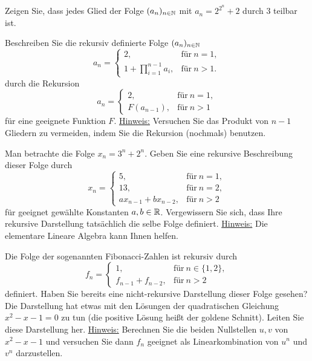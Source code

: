 \begin{aufg}
	Zeigen Sie, dass jedes Glied der Folge $(a_n)_{n \in \mathbb{N}}$ mit $a_n = 2^{2^n} + 2$ durch $3$ teilbar ist. 
\end{aufg} 

\begin{aufg}
	Beschreiben Sie die rekursiv definierte Folge $(a_n)_{n \in \mathbb{N}}$ 
	\[
		a_n = \begin{cases} 
		2, & \text{für} \ n = 1, 
		\\ 1 + \prod_{i=1}^{n-1} a_i, & \text{für} \ n >1. 
		\end{cases}
	\]
	durch die Rekursion 
	\[
		a_n = \begin{cases}
			2, & \text{für} \ n =1,
			\\ F(a_{n-1}), & \text{für} \ n >1
		\end{cases} 
	\]
	für eine geeignete Funktion $F$. \underline{Hinweis:} Versuchen Sie das Produkt von $n-1$ Gliedern zu vermeiden, indem Sie die Rekursion (nochmals) benutzen. 
\end{aufg} 

\begin{aufg}
	Man betrachte die Folge $x_n = 3^n + 2^n$. Geben Sie eine rekursive Beschreibung dieser Folge durch 
	\[
		x_n = \begin{cases} 5, & \text{für} \ n=1,
			\\ 13, & \text{für} \ n=2, 
			\\ a x_{n-1} + b x_{n-2}, & \text{für} \ n > 2 
		\end{cases} 
	\]
	 für geeignet gewählte Konstanten $a, b \in \mathbb{R}$. Vergewissern Sie sich, dass Ihre rekursive Darstellung tatsächlich die selbe Folge definiert. \underline{Hinweis:} Die elementare Lineare Algebra kann Ihnen helfen. 
\end{aufg} 

\begin{aufg} 
	Die Folge der sogenannten Fibonacci-Zahlen ist rekursiv durch 
	\[
		f_n = \begin{cases} 
			1, & \text{für} \ n  \in \{1,2\}, 
			\\ f_{n-1} + f_{n-2}, & \text{für} \ n>2
		\end{cases} 
	\]
	definiert. 
	Haben Sie bereits eine nicht-rekursive Darstellung dieser Folge gesehen? Die Darstellung hat etwas mit den Lösungen der quadratischen Gleichung $x^2 - x -1 = 0$ zu tun (die positive Lösung heißt der goldene Schnitt). Leiten Sie diese Darstellung her. \underline{Hinweis:} Berechnen Sie die beiden Nullstellen $u,v$ von $x^2-x-1$ und versuchen Sie dann $f_n$ geeignet als Linearkombination von $u^n$ und $v^n$ darzustellen. 
\end{aufg} 


